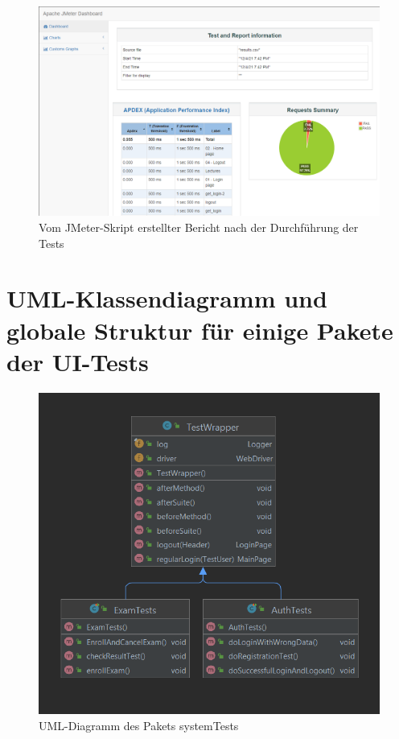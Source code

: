 \begin{figure}[H]
    \centering
    \includegraphics[scale=0.5]{images/jmeter-report}
    \caption{Vom JMeter-Skript erstellter Bericht nach der Durchführung der Tests} \label{fig:jmeter-report}
\end{figure}


\section{UML-Klassendiagramm und globale Struktur für einige Pakete der UI-Tests}

\begin{figure}[H]
    \centering
    \includegraphics[scale=0.6]{images/system-test-uml}
    \caption{UML-Diagramm des Pakets systemTests} \label{fig:system-package}
\end{figure}

